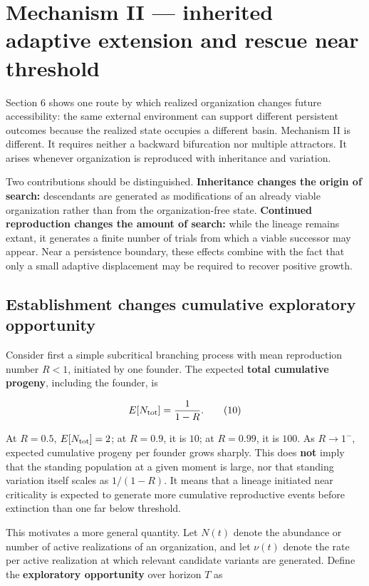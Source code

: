 \documentclass[11pt]{article}
\begin{document}
\section{Mechanism II --- inherited adaptive extension and rescue
near
threshold}
Section 6 shows one route by which realized organization changes future
accessibility: the same external environment can support different
persistent outcomes because the realized state occupies a different
basin. Mechanism II is different. It requires neither a backward
bifurcation nor multiple attractors. It arises whenever organization is
reproduced with inheritance and variation.

Two contributions should be distinguished. \textbf{Inheritance changes
the origin of search:} descendants are generated as modifications of an
already viable organization rather than from the organization-free
state. \textbf{Continued reproduction changes the amount of search:}
while the lineage remains extant, it generates a finite number of trials
from which a viable successor may appear. Near a persistence boundary,
these effects combine with the fact that only a small adaptive
displacement may be required to recover positive growth.

\subsection{Establishment changes cumulative exploratory
opportunity}
Consider first a simple subcritical branching process with mean
reproduction number \(R<1\), initiated by one founder. The expected
\textbf{total cumulative progeny}, including the founder, is

\[
E[N_{\rm tot}] = \frac{1}{1-R}. \tag{10}
\]

At \(R=0.5\), \(E[N_{\rm tot}]=2\); at \(R=0.9\), it is \(10\); at
\(R=0.99\), it is \(100\). As \(R\to1^-\), expected cumulative progeny
per founder grows sharply. This does \textbf{not} imply that the
standing population at a given moment is large, nor that standing
variation itself scales as \(1/(1-R)\). It means that a lineage
initiated near criticality is expected to generate more cumulative
reproductive events before extinction than one far below threshold.

This motivates a more general quantity. Let \(N(t)\) denote the
abundance or number of active realizations of an organization, and let
\(\nu(t)\) denote the rate per active realization at which relevant
candidate variants are generated. Define the \textbf{exploratory
opportunity} over horizon \(T\) as
\end{document}
